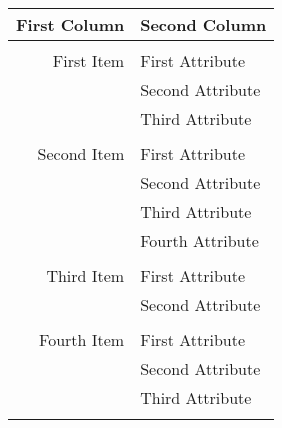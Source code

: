 \documentclass[10pt,a4paper]{article}
\begin{document}
\begin{tabular}{rl}
{\bf First Column} & {\bf Second Column} \\\hline \\ [-1.5ex]
First Item & First Attribute \\
& Second Attribute \\
& Third Attribute \\ [1ex] \hline \\ [-1.5ex]
Second Item & First Attribute \\
& Second Attribute \\
& Third Attribute \\
& Fourth Attribute \\ [1ex] \hline \\ [-1.5ex]
Third Item & First Attribute \\
& Second Attribute \\ [1ex] \hline \\ [-1.5ex]
Fourth Item & First Attribute \\
& Second Attribute \\
& Third Attribute \\ [1ex] \hline \\ [-1.5ex]
\end{tabular}
\end{document}
